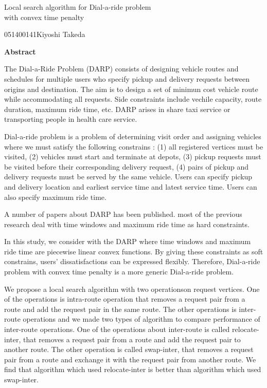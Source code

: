 

\newpage
\begin{center}{\LARGE Local  search algorithm for Dial-a-ride problem\\ with convex time penalty}\\[0.5cm]
\end{center}
\hfill {\large 051400141\qquad Kiyoshi Takeda}\\[0.5cm]
\begin{center}
{\large \bf Abstract}\\
\end{center}
The Dial-a-Ride Problem (DARP) consists of designing vehicle routes and schedules for multiple users who specify pickup and delivery requests between origins and destination. The aim is to design a set of minimun cost vehicle route while accommodating all requests. Side constraints include vechile capacity, route duration, maximum ride time, etc. DARP arises in share taxi service or transporting people in health care service.

Dial-a-ride problem is a problem of determining visit order and assigning vehicles where we must satisfy the following constrains : (1) all registered vertices must be visited, (2) vehicles must start and terminate at depots, (3) pickup requests must be visited before their corresponding delivery request, (4) pairs of pickup and delivery requests must be served by the same vehicle.  Users can specify pickup and delivery location and earliest service time and latest service time. Users can also specify maximum ride time.

A number of papers about DARP has been published. most of the previous research deal with time windows and maximum ride time as hard constraints.

In this study, we consider with the DARP where time windows and maximum ride time are piecewise linear convex functions. By giving these constraints as soft constrains, users' dissatisfactions can be expressed flexibly. Therefore, Dial-a-ride problem with convex time penalty is a more generic Dial-a-ride problem.

We propose a local search algorithm with two operationson request vertices. One of the operations is intra-route operation that removes a request pair from a route and add the request pair in the same route. The other operations is inter-route operations and we made two types of algorithm to compare performance of inter-route operations.
One of the operations about inter-route is called relocate-inter, that removes a request pair from a route and add the request pair to another route. The other operation is called swap-inter, that removes a request pair from a route and exchange it with the request pair from another route.
We find that algorithm which used relocate-inter is better than algorithm which used swap-inter.

